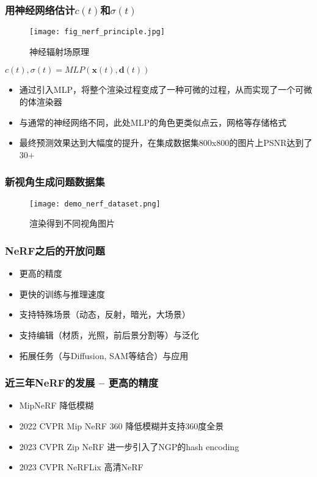 

\begin{frame}
    \frametitle{用神经网络估计$c(t)$和$\sigma(t)$}
    \begin{figure}[H]
        \centering
        \texttt{[image: fig\_nerf\_principle.jpg]}
        \caption{神经辐射场原理}
        \label{fig:nerf_principle}
    \end{figure}
    $c(t),\sigma(t)=MLP(\mathbf{x}(t),\mathbf{d}(t))$
    \begin{itemize}
        \item 通过引入MLP，将整个渲染过程变成了一种可微的过程，从而实现了一个可微的体渲染器
        \item 与通常的神经网络不同，此处MLP的角色更类似点云，网格等存储格式
        \item 最终预测效果达到大幅度的提升，在集成数据集800x800的图片上PSNR达到了30+
    \end{itemize}
\end{frame}

\begin{frame}
    \frametitle{新视角生成问题数据集}
    \begin{figure}[H]
        \texttt{[image: demo\_nerf\_dataset.png]}
        \caption[short]{渲染得到不同视角图片}
    \end{figure}

\end{frame}



\begin{frame}
    \frametitle{NeRF之后的开放问题}
    \begin{itemize}
        \item 更高的精度
        \item 更快的训练与推理速度
        \item 支持特殊场景（动态，反射，暗光，大场景）
        \item 支持编辑（材质，光照，前后景分割等）与泛化
        \item 拓展任务（与Diffusion, SAM等结合）与应用
    \end{itemize}
\end{frame}

\begin{frame}
    \frametitle{近三年NeRF的发展 -- 更高的精度}
    \begin{itemize}
        \item MipNeRF \cite{barronMipNeRFMultiscaleRepresentation2021} 降低模糊
        \item 2022 CVPR Mip NeRF 360 \cite{barronMipNeRF360Unbounded2022} 降低模糊并支持360度全景
        \item 2023 CVPR Zip NeRF \cite{barronZipNeRFAntiAliasedGridBased2023} 进一步引入了NGP的hash encoding
        \item 2023 CVPR NeRFLix \cite{zhouNeRFLiXHighQualityNeural2023} 高清NeRF
    \end{itemize}
\end{frame}

